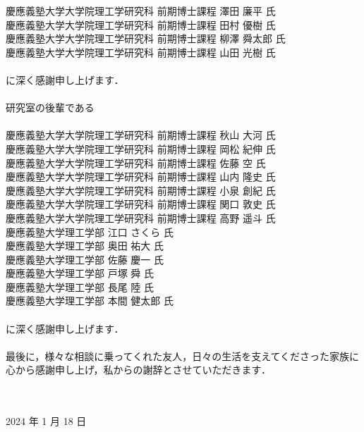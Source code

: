 {  \hspace{1cm}慶應義塾大学大学院理工学研究科 前期博士課程 澤田 廉平 氏 \\
  \hspace{1cm}慶應義塾大学大学院理工学研究科 前期博士課程 田村 優樹 氏 \\
  \hspace{1cm}慶應義塾大学大学院理工学研究科 前期博士課程 柳澤 舜太郎 氏 \\
  \hspace{1cm}慶應義塾大学大学院理工学研究科 前期博士課程 山田 光樹 氏 \\
	\\
	に深く感謝申し上げます．\\
	\\
  研究室の後輩である\\
	\\
  \hspace{1cm}慶應義塾大学大学院理工学研究科 前期博士課程 秋山 大河 氏 \\
  \hspace{1cm}慶應義塾大学大学院理工学研究科 前期博士課程 岡松 紀伸 氏 \\
  \hspace{1cm}慶應義塾大学大学院理工学研究科 前期博士課程 佐藤 空 氏 \\
  \hspace{1cm}慶應義塾大学大学院理工学研究科 前期博士課程 山内 隆史 氏 \\
  \hspace{1cm}慶應義塾大学大学院理工学研究科 前期博士課程 小泉 創紀 氏 \\
  \hspace{1cm}慶應義塾大学大学院理工学研究科 前期博士課程 関口 敦史 氏 \\
  \hspace{1cm}慶應義塾大学大学院理工学研究科 前期博士課程 高野 遥斗 氏 \\
  \hspace{1cm}慶應義塾大学理工学部 江口 さくら 氏 \\
  \hspace{1cm}慶應義塾大学理工学部 奥田 祐大 氏 \\
  \hspace{1cm}慶應義塾大学理工学部 佐藤 慶一 氏 \\
  \hspace{1cm}慶應義塾大学理工学部 戸塚 舜 氏 \\
  \hspace{1cm}慶應義塾大学理工学部 長尾 陸 氏 \\
  \hspace{1cm}慶應義塾大学理工学部 本間 健太郎 氏 \\
	\\
	に深く感謝申し上げます．\\
	\\
	最後に，様々な相談に乗ってくれた友人，日々の生活を支えてくださった家族に心から感謝申し上げ，私からの謝辞とさせていただきます．\\
	\\
	\\
	\begin{flushright}
		2024 年 1 月 18 日
	\end{flushright}
}